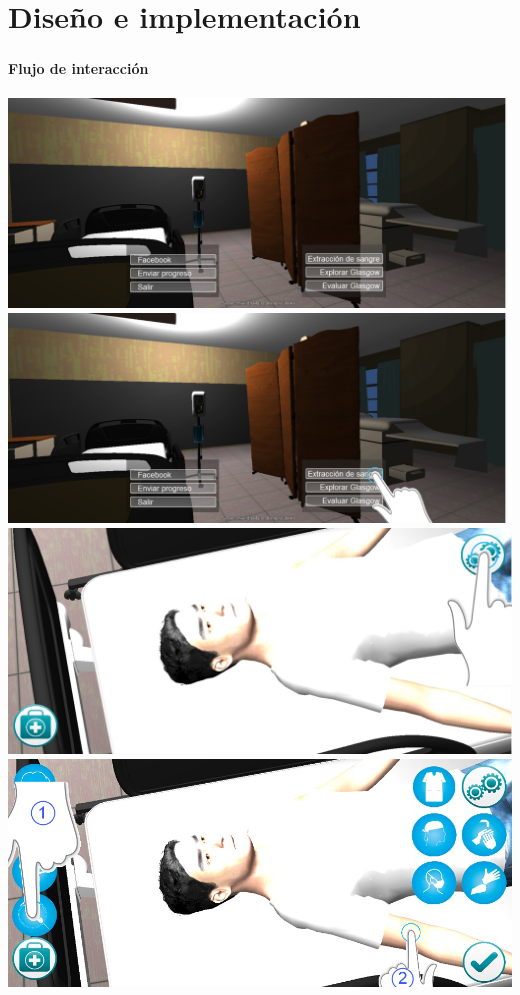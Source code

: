\section{Diseño e implementación}
\setcounter{sectiontotal}{3}

\begin{frame}
\frametitle{\pagetitle}
\framesubtitle{Flujo de interacción}
\centering
\begin{overprint}
 \includegraphics[width=\textwidth]{../solucion/images/pantalla_inicio.jpg} 
 \includegraphics[width=\textwidth]{imagenes/flujo/flujo2.png} 
 \includegraphics[width=\textwidth]{imagenes/flujo/flujo3.png} 
 \includegraphics[width=\textwidth]{imagenes/flujo/flujo4.png} 

\end{overprint}
\end{frame}

